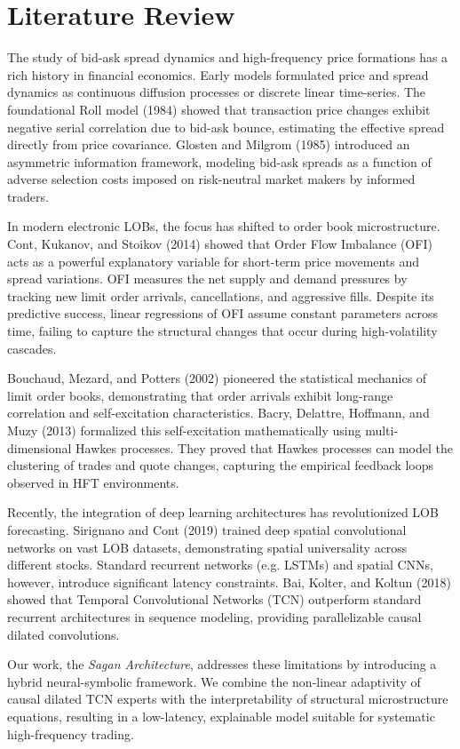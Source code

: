 \documentclass[11pt,a4paper]{article}
\begin{document}
\section{Literature Review}
The study of bid-ask spread dynamics and high-frequency price formations has a rich history in financial economics. Early models formulated price and spread dynamics as continuous diffusion processes or discrete linear time-series. The foundational Roll model (1984) showed that transaction price changes exhibit negative serial correlation due to bid-ask bounce, estimating the effective spread directly from price covariance. Glosten and Milgrom (1985) introduced an asymmetric information framework, modeling bid-ask spreads as a function of adverse selection costs imposed on risk-neutral market makers by informed traders. 

In modern electronic LOBs, the focus has shifted to order book microstructure. Cont, Kukanov, and Stoikov (2014) showed that Order Flow Imbalance (OFI) acts as a powerful explanatory variable for short-term price movements and spread variations. OFI measures the net supply and demand pressures by tracking new limit order arrivals, cancellations, and aggressive fills. Despite its predictive success, linear regressions of OFI assume constant parameters across time, failing to capture the structural changes that occur during high-volatility cascades.

Bouchaud, Mezard, and Potters (2002) pioneered the statistical mechanics of limit order books, demonstrating that order arrivals exhibit long-range correlation and self-excitation characteristics. Bacry, Delattre, Hoffmann, and Muzy (2013) formalized this self-excitation mathematically using multi-dimensional Hawkes processes. They proved that Hawkes processes can model the clustering of trades and quote changes, capturing the empirical feedback loops observed in HFT environments. 

Recently, the integration of deep learning architectures has revolutionized LOB forecasting. Sirignano and Cont (2019) trained deep spatial convolutional networks on vast LOB datasets, demonstrating spatial universality across different stocks. Standard recurrent networks (e.g. LSTMs) and spatial CNNs, however, introduce significant latency constraints. Bai, Kolter, and Koltun (2018) showed that Temporal Convolutional Networks (TCN) outperform standard recurrent architectures in sequence modeling, providing parallelizable causal dilated convolutions. 

Our work, the \textit{Sagan Architecture}, addresses these limitations by introducing a hybrid neural-symbolic framework. We combine the non-linear adaptivity of causal dilated TCN experts with the interpretability of structural microstructure equations, resulting in a low-latency, explainable model suitable for systematic high-frequency trading.
\end{document}
